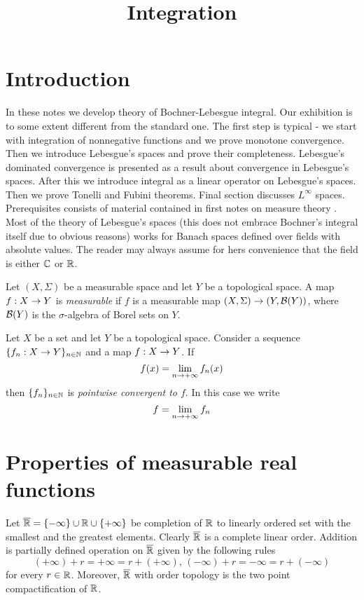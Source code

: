 



\title{Integration}
\date{}
\maketitle

\section{Introduction}
In these notes we develop theory of Bochner-Lebesgue integral. Our exhibition is to some extent different from the standard one. The first step is typical - we start with integration of nonnegative functions and we prove monotone convergence. Then we introduce Lebesgue's spaces and prove their completeness. Lebesgue's dominated convergence is presented as a result about convergence in Lebesgue's spaces. After this we introduce integral as a linear operator on Lebesgue's spaces. Then we prove Tonelli and Fubini theorems. Final section discusses $L^{\infty}$ spaces.\\
Prerequisites consists of material contained in first notes on measure theory \cite{Introduction_to_measure_theory}. Most of the theory of Lebesgue's spaces (this does not embrace Bochner's integral itself due to obvious reasons) works for Banach spaces defined over fields with absolute values. The reader may always assume for hers convenience that the field is either ${\mathbb C}$ or ${\mathbb R}$.

\begin{definition}
    Let $(X,\Sigma)$ be a measurable space and let $Y$ be a topological space. A map $f:X\rightarrow Y$ is \textit{measurable} if $f$ is a measurable map $(X,\Sigma)\rightarrow (Y,{\mathcal B}(Y))$, where ${\mathcal B}(Y)$ is the $\sigma$-algebra of Borel sets on $Y$.
\end{definition}

\begin{definition}
    Let $X$ be a set and let $Y$ be a topological space. Consider a sequence $\{f_n:X\rightarrow Y\}_{n\in {\mathbb N}}$ and a map $f:X\rightarrow Y$. If
    $$f(x) = \lim_{n\rightarrow +\infty}f_n(x)$$
    then $\{f_n\}_{n\in {\mathbb N}}$ is \textit{pointwise convergent to $f$}. In this case we write
    $$f = \lim_{n\rightarrow +\infty}f_n$$
\end{definition}

\section{Properties of measurable real functions}
\noindent
Let $\overline{{\mathbb R}}=\{-\infty\} \cup {\mathbb R} \cup \{+\infty\}$ be completion of ${\mathbb R}$ to linearly ordered set with the smallest and the greatest elements. Clearly $\overline{{\mathbb R}}$ is a complete linear order. Addition is partially defined operation on $\overline{{\mathbb R}}$ given by the following rules
$$(+\infty)+r=+\infty=r+(+\infty),\,(-\infty)+r=-\infty=r+(-\infty)$$
for every $r\in {\mathbb R}$. Moreover, $\overline{{\mathbb R}}$ with order topology is the two point compactification of ${\mathbb R}$.

